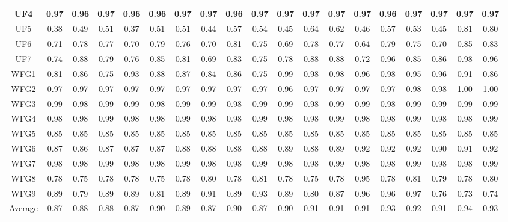 \begin{table}[]
\begin{tabular}{c|c|c|c|c|c|c|c|c|c|c|c|c|c|c|c|c|c|c|}
\multicolumn{1}{|c|}{UF4} & 0.97 & 0.96 & 0.97 & 0.96 & 0.96 & 0.97 & 0.97 & 0.96 & 0.97 & 0.97 & 0.97 & 0.97 & 0.97 & 0.96 & 0.97 & 0.97 & 0.97 & 0.97 \\ \hline
\multicolumn{1}{|c|}{UF5} & 0.38 & 0.49 & 0.51 & 0.37 & 0.51 & 0.51 & 0.44 & 0.57 & 0.54 & 0.45 & 0.64 & 0.62 & 0.46 & 0.57 & 0.53 & 0.45 & 0.81 & 0.80 \\ \hline
\multicolumn{1}{|c|}{UF6} & 0.71 & 0.78 & 0.77 & 0.70 & 0.79 & 0.76 & 0.70 & 0.81 & 0.75 & 0.69 & 0.78 & 0.77 & 0.64 & 0.79 & 0.75 & 0.70 & 0.85 & 0.83 \\ \hline
\multicolumn{1}{|c|}{UF7} & 0.74 & 0.88 & 0.79 & 0.76 & 0.85 & 0.81 & 0.69 & 0.83 & 0.75 & 0.78 & 0.88 & 0.88 & 0.72 & 0.96 & 0.85 & 0.86 & 0.98 & 0.96 \\ \hline
\multicolumn{1}{|c|}{WFG1} & 0.81 & 0.86 & 0.75 & 0.93 & 0.88 & 0.87 & 0.84 & 0.86 & 0.75 & 0.99 & 0.98 & 0.98 & 0.96 & 0.98 & 0.95 & 0.96 & 0.91 & 0.86 \\ \hline
\multicolumn{1}{|c|}{WFG2} & 0.97 & 0.97 & 0.97 & 0.97 & 0.97 & 0.97 & 0.97 & 0.97 & 0.97 & 0.96 & 0.97 & 0.97 & 0.97 & 0.97 & 0.98 & 0.98 & 1.00 & 1.00 \\ \hline
\multicolumn{1}{|c|}{WFG3} & 0.99 & 0.98 & 0.99 & 0.99 & 0.98 & 0.99 & 0.99 & 0.98 & 0.99 & 0.99 & 0.98 & 0.99 & 0.99 & 0.98 & 0.99 & 0.99 & 0.99 & 0.99 \\ \hline
\multicolumn{1}{|c|}{WFG4} & 0.98 & 0.98 & 0.99 & 0.98 & 0.98 & 0.99 & 0.98 & 0.98 & 0.99 & 0.98 & 0.98 & 0.99 & 0.98 & 0.98 & 0.99 & 0.98 & 0.98 & 0.99 \\ \hline
\multicolumn{1}{|c|}{WFG5} & 0.85 & 0.85 & 0.85 & 0.85 & 0.85 & 0.85 & 0.85 & 0.85 & 0.85 & 0.85 & 0.85 & 0.85 & 0.85 & 0.85 & 0.85 & 0.85 & 0.85 & 0.85 \\ \hline
\multicolumn{1}{|c|}{WFG6} & 0.87 & 0.86 & 0.87 & 0.87 & 0.87 & 0.88 & 0.88 & 0.88 & 0.88 & 0.89 & 0.88 & 0.89 & 0.92 & 0.92 & 0.92 & 0.90 & 0.91 & 0.92 \\ \hline
\multicolumn{1}{|c|}{WFG7} & 0.98 & 0.98 & 0.99 & 0.98 & 0.98 & 0.99 & 0.98 & 0.98 & 0.99 & 0.98 & 0.98 & 0.99 & 0.98 & 0.98 & 0.99 & 0.98 & 0.98 & 0.99 \\ \hline
\multicolumn{1}{|c|}{WFG8} & 0.78 & 0.75 & 0.78 & 0.78 & 0.75 & 0.78 & 0.80 & 0.78 & 0.81 & 0.78 & 0.75 & 0.78 & 0.95 & 0.78 & 0.81 & 0.79 & 0.78 & 0.80 \\ \hline
\multicolumn{1}{|c|}{WFG9} & 0.89 & 0.79 & 0.89 & 0.89 & 0.81 & 0.89 & 0.91 & 0.89 & 0.93 & 0.89 & 0.80 & 0.87 & 0.96 & 0.96 & 0.97 & 0.76 & 0.73 & 0.74 \\ \hline
\multicolumn{1}{|c|}{Average} & 0.87 & 0.88 & 0.88 & 0.87 & 0.90 & 0.89 & 0.87 & 0.90 & 0.87 & 0.90 & 0.91 & 0.91 & 0.91 & 0.93 & 0.92 & 0.91 & 0.94 & 0.93 \\ \hline
\end{tabular}
\end{table}


